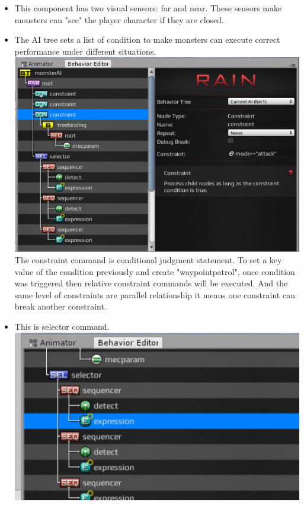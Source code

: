 \begin{itemize}
\item This component has two visual sensors: far and near. These sensors make monsters can "see" the player character if they are closed.\\
\item The AI tree sets a list of condition to make monsters can execute correct performance under different situations.\\
\includegraphics[scale=0.5]{img/RainWindows.png}
The constraint command is conditional judgment statement. To set a key value of the condition previously and create "waypointpatrol", once condition was triggered then relative constraint commands will be executed. And the same level of constraints are parallel relationship it means one constraint can break another constraint.\\
\item This is selector command.\\
\includegraphics[scale=0.5]{img/RainSelectE.png}\\

\end{itemize}
